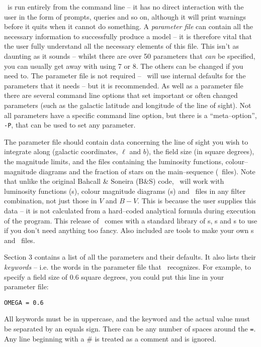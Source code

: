 \documentclass[11pt,twoside]{article}
\begin{document}
\bsm\ is run entirely from the command line -- it has no direct interaction
with the user in the form of prompts, queries and so on, although it will
print warnings before it quits when it cannot do something. A
{\em parameter file} can contain all the necessary information to successfully
produce a model -- it is therefore vital that the user fully understand
all the necessary elements of this file. This isn't as daunting as it 
sounds -- whilst there are over 50 parameters that {\em can} be specified, 
you can usually get away with using 7 or 8. The others can be changed if you 
need to. The parameter file is not required -- \bsm\ will use internal defaults
for the parameters that it needs -- but it is recommended. As well as a 
parameter file there are several command line options that set important or
often changed parameters (such as the galactic latitude and longitude of the
line of sight). Not all parameters have a specific command line option, but
there is a ``meta--option'', {\tt -P}, that can be used to set any parameter.

The parameter file should contain data concerning the line of sight you wish to
integrate along (galactic coordinates, $\ell$ and $b$), the field size (in
square degrees), the magnitude limits, and the files containing the
luminosity functions, colour--magnitude diagrams and the fraction of stars on
the main--sequence (\fms\ files). Note that unlike the
original Bahcall \& Soneira (B\&S) code, \bsm\ will work with luminosity
functions (\lf s), colour magnitude diagrams (\cmd s) and \fms\ files
in any filter combination, not just those in $V$ and $B-V$. 
This is because the user supplies this data -- it is not calculated from a 
hard--coded analytical formula during execution of the program.
This release of \bsm\ comes with a standard library of \lf s, \cmd s and
\fms s to use if you don't need anything too fancy. Also included are tools
to make your own \lf s and \fms\ files.

Section 3 contains a list of all the parameters and their defaults. 
It also lists their {\em keywords} -- i.e. the words in the parameter file 
that \bsm\ recognizes. For example, to specify a field size of 0.6 square 
degrees, you could put this line in your parameter file:
\begin{verbatim}
OMEGA = 0.6
\end{verbatim}
All keywords must be in uppercase, and the keyword and the actual value
must be separated by an equals sign. There can be any number of spaces
around the {\tt =}. Any line beginning with a \# is treated as a comment and is
ignored.
\end{document}
